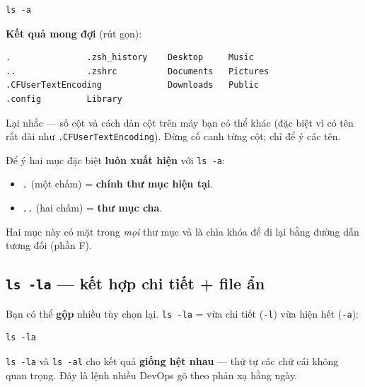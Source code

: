 \documentclass[12pt,a4paper]{article}
\begin{document}
\begin{codebox}
\begin{verbatim}
ls -a
\end{verbatim}
\end{codebox}

\textbf{Kết quả mong đợi} (rút gọn):

\begin{codebox}
\begin{verbatim}
.               .zsh_history    Desktop     Music
..              .zshrc          Documents   Pictures
.CFUserTextEncoding             Downloads   Public
.config         Library
\end{verbatim}
\end{codebox}

\begin{notebox}[title={Trấn an}]
Lại nhắc --- số cột và cách dàn cột trên máy bạn có thể khác (đặc biệt vì có tên rất dài như \texttt{.CFUserTextEncoding}). Đừng cố canh từng cột; chỉ để ý các tên.
\end{notebox}

Để ý hai mục đặc biệt \textbf{luôn xuất hiện} với \texttt{ls -a}:

\begin{itemize}[leftmargin=*]
  \item \texttt{.} (một chấm) = \textbf{chính thư mục hiện tại}.
  \item \texttt{..} (hai chấm) = \textbf{thư mục cha}.
\end{itemize}

Hai mục này có mặt trong \textit{mọi} thư mục và là chìa khóa để đi lại bằng đường dẫn tương đối (phần F).

\subsection{\texttt{ls -la} --- kết hợp chi tiết + file ẩn}

Bạn có thể \textbf{gộp} nhiều tùy chọn lại. \texttt{ls -la} = vừa chi tiết (\texttt{-l}) vừa hiện hết (\texttt{-a}):

\begin{codebox}
\begin{verbatim}
ls -la
\end{verbatim}
\end{codebox}

\texttt{ls -la} và \texttt{ls -al} cho kết quả \textbf{giống hệt nhau} --- thứ tự các chữ cái không quan trọng. Đây là lệnh nhiều DevOps gõ theo phản xạ hằng ngày.
\end{document}
